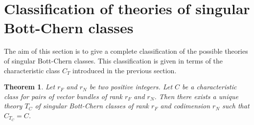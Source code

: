 \documentclass[10pt,twoside]{article}
\numberwithin{equation}{section}
\theoremstyle{plain}
\newtheorem{theorem}[equation]{Theorem}
\theoremstyle{definition}
\begin{document}
\section{Classification of theories of singular Bott-Chern classes}
\label{sec:class-theor-sing}

The aim of this section is to give a complete classification of the
possible theories of singular Bott-Chern classes. This classification
is given in terms of the characteristic class $C_{T}$ introduced in
the previous section.

\begin{theorem} \label{thm:6}
  Let $r_{F}$ and $r_{N}$ be two positive integers. Let $C$ be a
  characteristic 
  class for pairs of vector bundles of rank $r_{F}$ and $r_{N}$.
  Then there exists a unique theory $T_{C}$ of singular Bott-Chern
  classes of rank $r_{F}$ and codimension $r_{N}$ such that
  $C_{T_{C}}=C$.  
\end{theorem}
\end{document}
